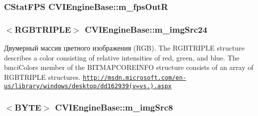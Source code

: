 \hypertarget{class_c_v_i_engine_base_a2ad39d8c6557ef3c0dd6fb9dc376c8b5}{
\subsubsection[{m\+\_\+fps\+Out\+R}]{\setlength{\rightskip}{0pt plus 5cm}C\+Stat\+F\+P\+S C\+V\+I\+Engine\+Base\+::m\+\_\+fps\+Out\+R}}\label{class_c_v_i_engine_base_a2ad39d8c6557ef3c0dd6fb9dc376c8b5}




\hypertarget{class_c_v_i_engine_base_a252e6e1285e6063718c7d7a874298363}{
\subsubsection[{m\+\_\+img\+Src24}]{$<$R\+G\+B\+T\+R\+I\+P\+L\+E$>$ C\+V\+I\+Engine\+Base\+::m\+\_\+img\+Src24}}\label{class_c_v_i_engine_base_a252e6e1285e6063718c7d7a874298363}


Двумерный массив цветного изображения (R\+G\+B). The R\+G\+B\+T\+R\+I\+P\+L\+E structure describes a color consisting of relative intensities of red, green, and blue. The bmci\+Colors member of the B\+I\+T\+M\+A\+P\+C\+O\+R\+E\+I\+N\+F\+O structure consists of an array of R\+G\+B\+T\+R\+I\+P\+L\+E structures. \href{http://msdn.microsoft.com/en-us/library/windows/desktop/dd162939(v=vs.85).aspx}{\tt http\+://msdn.\+microsoft.\+com/en-\/us/library/windows/desktop/dd162939(v=vs.).\+aspx} 

\hypertarget{class_c_v_i_engine_base_aa935595a167539c89a4d06a57178d776}{
\subsubsection[{m\+\_\+img\+Src8}]{$<$B\+Y\+T\+E$>$ C\+V\+I\+Engine\+Base\+::m\+\_\+img\+Src8}}\label{class_c_v_i_engine_base_aa935595a167539c89a4d06a57178d776}


